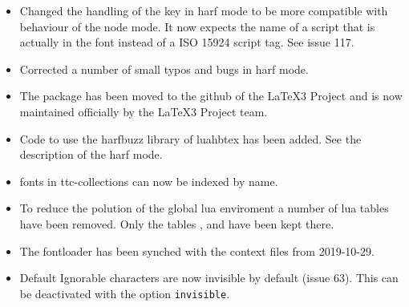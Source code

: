 \endsubsection
{}
\begin{itemize}
\item Changed the handling of the  key in harf mode to be more compatible with behaviour of the node mode. It now expects the name of a script that is actually in the font instead of a ISO 15924 script tag. See issue 117.
\item Corrected a number of small typos and bugs in harf mode.
\end{itemize}
\endsubsection
{}
\begin{itemize}
\item   The package has been moved to the github of the LaTeX3 Project and is now maintained
        officially by the LaTeX3 Project team.
\item   Code to use the harfbuzz library of luahbtex has been added. See the description of the harf mode.
\item   fonts in ttc-collections can now be indexed by name.
\item   To reduce the polution of the global lua enviroment a number of lua tables have been removed.
        Only the tables ,  and  have been kept there.
\item   The fontloader has been synched with the context files from 2019-10-29.

\end{itemize}
\endsubsection


\begin{itemize}
\item Default Ignorable characters are now invisible by default (issue 63). This can be deactivated with the option \texttt{invisible}.
\end{itemize}
\endsubsection

